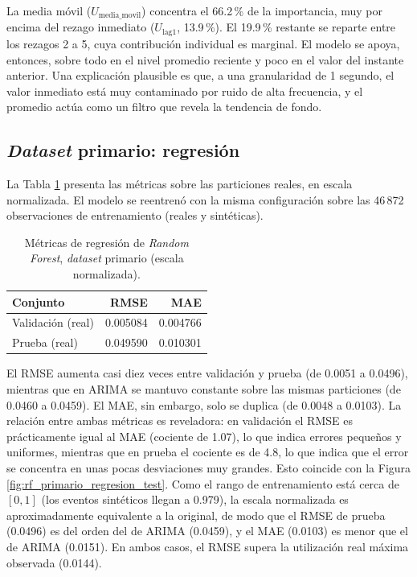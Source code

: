 \documentclass[12pt]{report}
\begin{document}
La media móvil ($U_{\text{media\_movil}}$) concentra el 66.2\,\% de la importancia, muy por encima del rezago inmediato ($U_{\text{lag1}}$, 13.9\,\%). El 19.9\,\% restante se reparte entre los rezagos 2 a 5, cuya contribución individual es marginal. El modelo se apoya, entonces, sobre todo en el nivel promedio reciente y poco en el valor del instante anterior. Una explicación plausible es que, a una granularidad de 1 segundo, el valor inmediato está muy contaminado por ruido de alta frecuencia, y el promedio actúa como un filtro que revela la tendencia de fondo.

\subsection*{\textit{Dataset} primario: regresión}

La Tabla \ref{tab:rf_primario_regresion} presenta las métricas sobre las particiones reales, en escala normalizada. El modelo se reentrenó con la misma configuración sobre las 46\,872 observaciones de entrenamiento (reales y sintéticas).

\begin{table}[H]
    \centering
    \begin{tabular}{|l|r|r|}
        \hline
        \textbf{Conjunto} & \textbf{RMSE} & \textbf{MAE} \\
        \hline
        Validación (real) & 0.005084 & 0.004766 \\
        Prueba (real) & 0.049590 & 0.010301 \\
        \hline
    \end{tabular}
    \caption{Métricas de regresión de \textit{Random Forest}, \textit{dataset} primario (escala normalizada).}
    \label{tab:rf_primario_regresion}
\end{table}

El RMSE aumenta casi diez veces entre validación y prueba (de 0.0051 a 0.0496), mientras que en ARIMA se mantuvo constante sobre las mismas particiones (de 0.0460 a 0.0459). El MAE, sin embargo, solo se duplica (de 0.0048 a 0.0103). La relación entre ambas métricas es reveladora: en validación el RMSE es prácticamente igual al MAE (cociente de 1.07), lo que indica errores pequeños y uniformes, mientras que en prueba el cociente es de 4.8, lo que indica que el error se concentra en unas pocas desviaciones muy grandes. Esto coincide con la Figura \ref{fig:rf_primario_regresion_test}. Como el rango de entrenamiento está cerca de $[0,1]$ (los eventos sintéticos llegan a 0.979), la escala normalizada es aproximadamente equivalente a la original, de modo que el RMSE de prueba (0.0496) es del orden del de ARIMA (0.0459), y el MAE (0.0103) es menor que el de ARIMA (0.0151). En ambos casos, el RMSE supera la utilización real máxima observada (0.0144).
\end{document}
